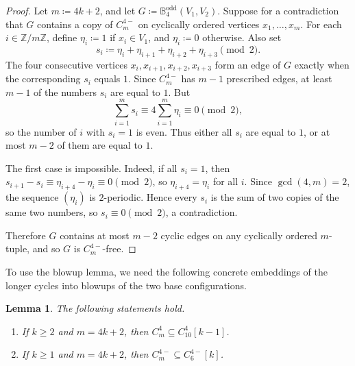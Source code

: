 \documentclass[10pt,a4paper]{article}
\theoremstyle{plain}
\newtheorem{lemma}[lemma]{Lemma}
\theoremstyle{definition}
\begin{document}
\begin{proof}
Let $m\coloneqq4k+2$, and let $G\coloneqq\mathbb{B}_4^{\mathrm{odd}}(V_1,V_2)$. Suppose for a contradiction that
$G$ contains a copy of $C_m^{4-}$ on cyclically ordered vertices $x_1,\dots,x_m$.
For each $i\in\mathbb Z/m\mathbb Z$, define $\eta_i\coloneqq1$ if $x_i\in V_1$, and
$\eta_i\coloneqq0$ otherwise. Also set
\[
s_i\coloneqq\eta_i+\eta_{i+1}+\eta_{i+2}+\eta_{i+3}\pmod 2.
\]
The four consecutive vertices $x_i,x_{i+1},x_{i+2},x_{i+3}$ form an edge of $G$ exactly when the corresponding $s_i$ equals $1$.
Since $C_m^{4-}$ has $m-1$ prescribed edges, at least $m-1$ of the numbers $s_i$ are
equal to $1$. But
\[
\sum_{i=1}^{m}s_i\equiv 4\sum_{i=1}^{m}\eta_i\equiv 0\pmod 2,
\]
so the number of $i$ with $s_i=1$ is even. Thus either all $s_i$ are equal to $1$, or
at most $m-2$ of them are equal to $1$.

The first case is impossible. Indeed, if all $s_i=1$, then
$s_{i+1}-s_i\equiv \eta_{i+4}-\eta_i\equiv 0\pmod 2$, so $\eta_{i+4}=\eta_i$ for all $i$.
Since $\gcd(4,m)=2$, the sequence $(\eta_i)$ is $2$-periodic. Hence every $s_i$ is the
sum of two copies of the same two numbers, so $s_i\equiv 0\pmod 2$, a contradiction.

Therefore $G$ contains at most $m-2$ cyclic edges on any cyclically ordered $m$-tuple,
and so $G$ is $C_m^{4-}$-free.
\end{proof}


To use the blowup lemma, we need the following concrete embeddings of the longer cycles into blowups of the two base configurations.

\begin{lemma}\label{LEM:cycle-blowup-embeddings}
The following statements hold.
\begin{enumerate}[label=\textup{(\roman*)}]
\item If $k\ge2$ and $m=4k+2$, then $C_m^4\subseteq C_{10}^4[k-1]$.
\item If $k\ge1$ and $m=4k+2$, then $C_m^{4-}\subseteq C_6^{4-}[k]$.
\end{enumerate}
\end{lemma}
\end{document}
